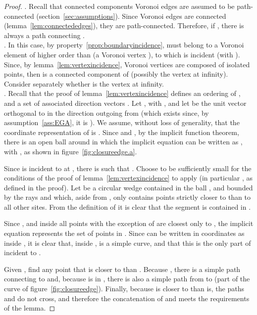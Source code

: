 \documentclass[11pt]{article}
\begin{document}
\begin{proof}
\noindent{{\bf [Case ]}}. 
Recall that connected components Voronoi edges are assumed to be path-connected (section~\ref{sec:assumptions}). 
Since Voronoi edges are connected (lemma~\ref{lem:connectededges}), they are path-connected. 
Therefore, if , there is always a path  connecting . \\

\noindent{{\bf [Case ]}}. 
In this case, by property~\ref{prop:boundaryincidence},  must belong to a Voronoi element of higher order than 
	(a Voronoi vertex ), to which  is incident (with ). 
Since, by lemma~\ref{lem:vertexincidence}, Voronoi vertices are composed of isolated points, 
	then  is a connected component of  (possibly the vertex at infinity). 
Consider separately whether  is the vertex at infinity. \\

.
Recall that the proof of lemma~\ref{lem:vertexincidence}
	defines an ordering of , and a set of associated direction vectors . 
Let , with , 
	and let  be the unit vector orthogonal to 
in the direction outgoing from 
	(which exists since, by assumption~\ref{ass:EGA}, it is ). 
We assume, without loss of generality, that the coordinate representation of  
	is . 
Since  and , by the implicit function theorem, 
	there is an open  ball  around  in which the implicit equation 
	can be written as , with , 
	as shown in figure~\ref{fig:closureedge.a}. 
	
Since  is incident to  at , 
	there is  such that . 
Choose  to be sufficiently small for the conditions of the proof of lemma~\ref{lem:vertexincidence} to apply
	(in particular , as defined in the proof). 
Let  be a circular wedge contained in the  ball , 
	and bounded by the rays  and  which, 
	aside from , only contains points strictly closer to  than to all other sites.  
From the definition of  it is clear that the segment  
	is contained in .

Since , and inside  all points with the exception of  are closest only to , 
	the implicit equation  represents the set of points in . 
Since  can be written in coordinates as  inside , 
	it is clear that, inside ,  is a simple curve, and that this is the only part of  incident to . 


Given , find any point  that is closer to  than . 
Because , there is a simple path  connecting  to  and, 
	because  is in , there is also a simple path 
	 from  to 
	(part of the curve  of figure~\ref{fig:closureedge}). 
Finally, because  is closer to  than  is, 
	the paths  and  do not cross, and therefore the 
	concatenation of  and  
	meets the requirements of the lemma. 
	








\end{proof}
\end{document}
